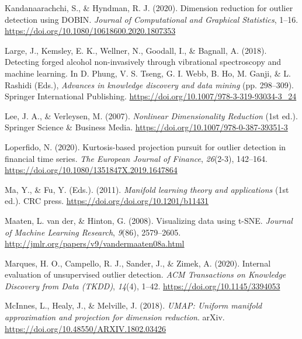 \documentclass[
  10pt]{article}
\newlength{\cslhangindent}
\newlength{\cslentryspacingunit} %
\newenvironment{CSLReferences}[2] %
 {%
  \setlength{\parindent}{0pt}
  \ifodd #1
  \let\oldpar\par
  \def\par{\hangindent=\cslhangindent\oldpar}
  \fi
  \setlength{\parskip}{#2\cslentryspacingunit}
 }%
 {}
\begin{document}
\begin{CSLReferences}{1}{0}
\leavevmode{}%
Kandanaarachchi, S., \& Hyndman, R. J. (2020). Dimension reduction for outlier detection using {DOBIN}. \emph{Journal of Computational and Graphical Statistics}, 1--16. \url{https://doi.org/10.1080/10618600.2020.1807353}

\leavevmode{}%
Large, J., Kemsley, E. K., Wellner, N., Goodall, I., \& Bagnall, A. (2018). Detecting forged alcohol non-invasively through vibrational spectroscopy and machine learning. In D. Phung, V. S. Tseng, G. I. Webb, B. Ho, M. Ganji, \& L. Rashidi (Eds.), \emph{Advances in knowledge discovery and data mining} (pp. 298--309). Springer International Publishing. \url{https://doi.org/10.1007/978-3-319-93034-3_24}

\leavevmode{}%
Lee, J. A., \& Verleysen, M. (2007). \emph{Nonlinear {Dimensionality} {Reduction}} (1st ed.). Springer Science \& Business Media. \url{https://doi.org/10.1007/978-0-387-39351-3}

\leavevmode{}%
Loperfido, N. (2020). Kurtosis-based projection pursuit for outlier detection in financial time series. \emph{The European Journal of Finance}, \emph{26}(2-3), 142--164. \url{https://doi.org/10.1080/1351847X.2019.1647864}

\leavevmode{}%
Ma, Y., \& Fu, Y. (Eds.). (2011). \emph{Manifold learning theory and applications} (1st ed.). CRC press. \url{https://doi.org/doi.org/10.1201/b11431}

\leavevmode{}%
Maaten, L. van der, \& Hinton, G. (2008). Visualizing data using t-{SNE}. \emph{Journal of Machine Learning Research}, \emph{9}(86), 2579--2605. \url{http://jmlr.org/papers/v9/vandermaaten08a.html}

\leavevmode{}%
Marques, H. O., Campello, R. J., Sander, J., \& Zimek, A. (2020). Internal evaluation of unsupervised outlier detection. \emph{ACM Transactions on Knowledge Discovery from Data (TKDD)}, \emph{14}(4), 1--42. \url{https://doi.org/10.1145/3394053}

\leavevmode{}%
McInnes, L., Healy, J., \& Melville, J. (2018). \emph{{UMAP}: Uniform manifold approximation and projection for dimension reduction}. arXiv. \url{https://doi.org/10.48550/ARXIV.1802.03426}


\end{CSLReferences}
\end{document}
